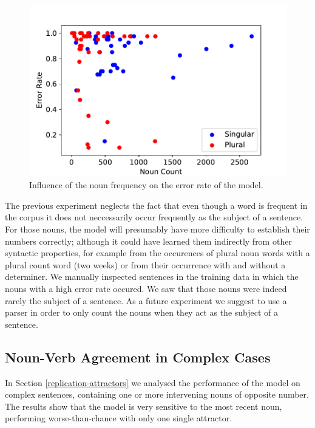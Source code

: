         \begin{figure}
          \centering
        \includegraphics[scale=0.5]{noun_freq_error_rate}
        \caption{Influence of the noun frequency on the error rate of the model.}
        \label{fig:noun_freq_error}
    \end{figure}
    
    
The previous experiment neglects the fact that even though a word is frequent in the corpus 
it does not neccessarily occur frequently as the subject of a sentence. 
For those nouns, the model will presumably 
have more difficulty to establish their numbers correctly;
although it could have learned them indirectly from other syntactic
properties, for example from the occurences of plural noun words
with a plural count word (two weeks) or from their occurrence 
with and without a determiner.
We manually inspected sentences in the training data in which
the nouns with a high error rate occured. We saw that those nouns were 
indeed rarely the subject of a sentence. As a future experiment we suggest 
to use a parser in order to only count the nouns when 
they act as the subject of a sentence. 

\subsection{Noun-Verb Agreement in Complex Cases}

In Section \ref{replication-attractors} we analysed the performance of the model
on complex sentences, containing one or more 
intervening nouns of opposite number.
The results show that the model is very
sensitive to the most recent noun,
performing worse-than-chance with only one single attractor.


